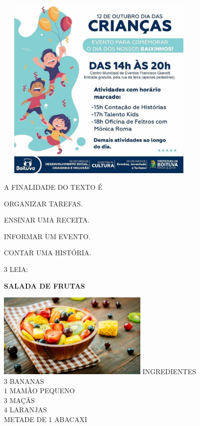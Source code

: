 \includegraphics[width=4.03663in,height=3.60910in]{media/image158.jpg}

A FINALIDADE DO TEXTO É

\begin{escolha}
\item ORGANIZAR TAREFAS.

\item ENSINAR UMA RECEITA.

\item INFORMAR UM EVENTO.

\item CONTAR UMA HISTÓRIA.
\end{escolha}

\num{3} LEIA:

\textbf{SALADA DE FRUTAS}

\includegraphics[width=2.90350in,height=1.63264in]{media/image159.jpg}
INGREDIENTES\\
3 BANANAS\\
1 MAMÃO PEQUENO\\
3 MAÇÃS\\
4 LARANJAS\\
METADE DE 1 ABACAXI

